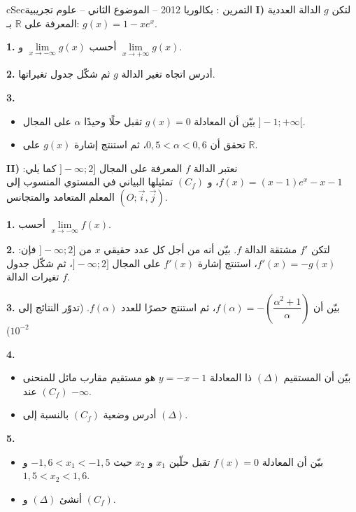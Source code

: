 \documentclass[12pt,a4paper]{article}
\newenvironment{BOX}[2]{\begin{otherlanguage}{english}\begin{arbox}{#1}{#2}}{\end{arbox}\end{otherlanguage}}
\newcounter{exo}
\newenvironment{tamrin}[1]{\stepcounter{exo}\begin{BOX}{cSec}{التمرين \theexo: #1}}{\end{BOX}}
\newcommand{\R}{\mathbb{R}}
\newenvironment{sq}{\begin{itemize}[leftmargin=2.4em,itemsep=3pt]}{\end{itemize}}
\newcommand{\qa}{\item[(أ)]}\newcommand{\qb}{\item[(ب)]}\newcommand{\qc}{\item[(جـ)]}\newcommand{\qd}{\item[(د)]}\newcommand{\qe}{\item[(هـ)]}
\newcommand{\QQ}[1]{\par\smallskip\textbf{#1.} }
\begin{document}
\begin{tamrin}{بكالوريا 2012 -- الموضوع الثاني -- علوم تجريبية}
\textbf{I)} لتكن $g$ الدالة العددية المعرفة على $\R$ بـ: $g(x)=1-xe^x$.

\QQ{1} أحسب $\lim\limits_{x\to-\infty}g(x)$ و $\lim\limits_{x\to+\infty}g(x)$.
\QQ{2} أدرس اتجاه تغير الدالة $g$ ثم شكّل جدول تغيراتها.
\QQ{3}
\begin{sq}
\qa بيّن أن المعادلة $g(x)=0$ تقبل حلًا وحيدًا $\alpha$ على المجال $]-1;+\infty[$.
\qb تحقق أن $0{,}5<\alpha<0{,}6$، ثم استنتج إشارة $g(x)$ على $\R$.
\end{sq}

\textbf{II)} نعتبر الدالة $f$ المعرفة على المجال $]{-}\infty;2]$ كما يلي: $f(x)=(x-1)e^x-x-1$، و $(C_f)$ تمثيلها البياني في المستوي المنسوب إلى المعلم المتعامد والمتجانس $(O;\vec i,\vec j)$.

\QQ{1} أحسب $\lim\limits_{x\to-\infty}f(x)$.
\QQ{2} لتكن $f'$ مشتقة الدالة $f$. بيّن أنه من أجل كل عدد حقيقي $x$ من $]{-}\infty;2]$ فإن: $f'(x)=-g(x)$، استنتج إشارة $f'(x)$ على المجال $]{-}\infty;2]$، ثم شكّل جدول تغيرات الدالة $f$.
\QQ{3} بيّن أن $f(\alpha)=-\left(\dfrac{\alpha^2+1}{\alpha}\right)$، ثم استنتج حصرًا للعدد $f(\alpha)$. (تدوّر النتائج إلى $10^{-2}$)
\QQ{4}
\begin{sq}
\qa بيّن أن المستقيم $(\Delta)$ ذا المعادلة $y=-x-1$ هو مستقيم مقارب مائل للمنحنى $(C_f)$ عند $-\infty$.
\qb أدرس وضعية $(C_f)$ بالنسبة إلى $(\Delta)$.
\end{sq}
\QQ{5}
\begin{sq}
\qa بيّن أن المعادلة $f(x)=0$ تقبل حلّين $x_1$ و $x_2$ حيث $-1{,}6<x_1<-1{,}5$ و $1{,}5<x_2<1{,}6$.
\qb أنشئ $(\Delta)$ و $(C_f)$.
\end{sq}
\end{tamrin}
\end{document}
